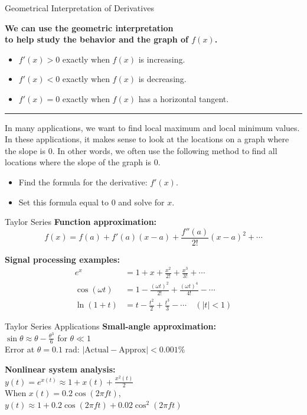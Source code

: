 \documentclass[aspectratio=169,xcolor=dvipsnames,svgnames,x11names,fleqn]{beamer}
\begin{document}
\begin{frame}{Geometrical Interpretation of Derivatives}
\begin{center}
    \bf We can use the geometric interpretation \\to help study the behavior and the graph of $f(x)$.
\end{center}
\begin{itemize}
    \item $f'(x) > 0$ exactly when $f(x)$ is increasing.
    \item $f'(x) < 0$ exactly when $f(x)$ is decreasing.
    \item $f'(x) = 0$ exactly when $f(x)$ has a horizontal tangent.
    \end{itemize}
\hrule \vspace{5pt}
\small
In many applications, we want to find local maximum and local minimum values. In these applications, it makes sense to look at the locations on a graph where the slope is $0$. In other words, we often use the following method to find all locations where
the slope of the graph is 0.
\begin{itemize}
    \item Find the formula for the derivative: $f'(x)$.
    \item Set this formula equal to $0$ and solve for $x$.
\end{itemize}
\end{frame}



\begin{frame}{Taylor Series}
\textbf{Function approximation:}
\[
f(x) = f(a) + f'(a)(x-a) + \frac{f''(a)}{2!}(x-a)^2 + \cdots
\]

\textbf{Signal processing examples:}
\begin{align*}
e^x &= 1 + x + \frac{x^2}{2!} + \frac{x^3}{3!} + \cdots \\
\cos(\omega t) &= 1 - \frac{(\omega t)^2}{2!} + \frac{(\omega t)^4}{4!} - \cdots \\
\ln(1+t) &= t - \frac{t^2}{2} + \frac{t^3}{3} - \cdots \quad (|t|<1)
\end{align*}
\end{frame}


\begin{frame}{Taylor Series Applications}
\textbf{Small-angle approximation:} \\
$\sin\theta \approx \theta - \frac{\theta^3}{6}$ for $\theta \ll 1$ \\
Error at $\theta=0.1$ rad: $| \text{Actual} - \text{Approx} | < 0.001\%$

\vspace{20pt}

\textbf{Nonlinear system analysis:} \\
$y(t) = e^{x(t)} \approx 1 + x(t) + \frac{x^2(t)}{2}$ \\
When $x(t) = 0.2\cos(2\pi f t)$, \\
$y(t) \approx 1 + 0.2\cos(2\pi f t) + 0.02\cos^2(2\pi f t)$
\end{frame}
\end{document}
